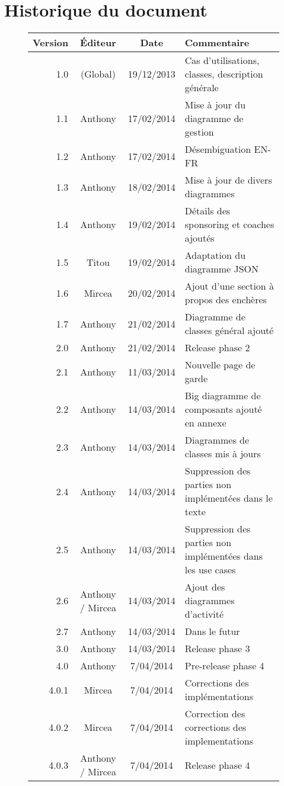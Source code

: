 \documentclass[a4paper, 11pt]{report}
\begin{document}
\section{Historique du document}
\begin{figure}[h!]
\centering
\begin{tabular}{| r | c | c | l |}
\hline
\textbf{Version} & \textbf{Éditeur} & \textbf{Date} & \textbf{Commentaire} \\
\hline
1.0 & (Global) & 19/12/2013 & Cas d'utilisations, classes, description générale\\
\hline
1.1 & Anthony & 17/02/2014 & Mise à jour du diagramme de gestion\\
\hline
1.2 & Anthony & 17/02/2014 & Désembiguation EN-FR\\
\hline
1.3 & Anthony & 18/02/2014 & Mise à jour de divers diagrammes\\
\hline
1.4 & Anthony & 19/02/2014 & Détails des sponsoring et coaches ajoutés\\
\hline
1.5 & Titou & 19/02/2014 & Adaptation du diagramme JSON\\
\hline
1.6 & Mircea & 20/02/2014 & Ajout d'une section à propos des enchères\\
\hline
1.7 & Anthony & 21/02/2014 & Diagramme de classes général ajouté\\
\hline
2.0 & Anthony & 21/02/2014 & Release phase 2\\
\hline
2.1 & Anthony & 11/03/2014 & Nouvelle page de garde\\
\hline
2.2 & Anthony & 14/03/2014 & Big diagramme de composants ajouté en annexe\\
\hline
2.3 & Anthony & 14/03/2014 & Diagrammes de classes mis à jours\\
\hline
2.4 & Anthony & 14/03/2014 & Suppression des parties non implémentées dans le texte\\
\hline
2.5 & Anthony & 14/03/2014 & Suppression des parties non implémentées dans les use cases\\
\hline
2.6 & Anthony / Mircea & 14/03/2014 & Ajout des diagrammes d'activité\\
\hline
2.7 & Anthony & 14/03/2014 & Dans le futur\\
\hline
3.0 & Anthony & 14/03/2014 & Release phase 3\\
\hline
4.0 & Anthony & 7/04/2014 & Pre-release phase 4\\
\hline
4.0.1 & Mircea & 7/04/2014 & Corrections des implémentations\\
\hline
4.0.2 & Mircea & 7/04/2014 & Correction des corrections des implementations \\
\hline
4.0.3 & Anthony / Mircea & 7/04/2014 & Release phase 4\\
\hline 
\end{tabular}
\end{figure}
\end{document}
